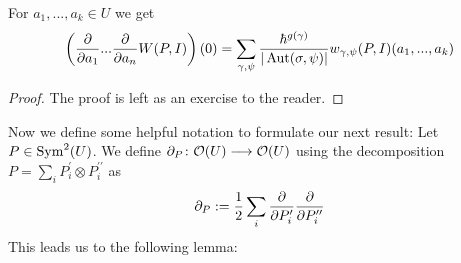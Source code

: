 \begin{lem}
  For $a_1, ..., a_k \in U$ we get
  $$ \left( \frac{\partial }{\partial a_1} ... \frac{\partial }{\partial a_n} W(P,I) \right)(0) = \sum_{\gamma, \psi} \frac{\hbar^{g(\gamma)}}{|\operatorname{Aut}(\sigma, \psi)|} w_{\gamma,\psi}(P,I)(a_1, ..., a_k) $$
\begin{proof}
  The proof is left as an exercise to the reader.
\end{proof}
\end{lem}

Now we define some helpful notation to formulate our next result: Let $P \in \operatorname{Sym}^2(U)$. We define $\partial_P \colon \mathcal{O}(U) \longrightarrow \mathcal{O}(U)$ using the decomposition $P = \sum_i P_i^\prime \otimes P^{\prime\prime}_i$ as
$$ \partial_P := \frac{1}{2} \sum_i \frac{\partial }{\partial P_i^\prime} \frac{\partial }{\partial P^{\prime\prime}_i} $$
This leads us to the following lemma:

